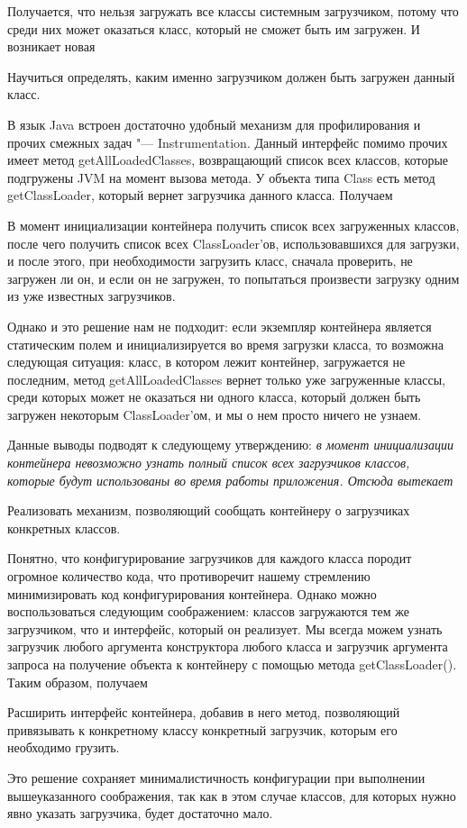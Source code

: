 Получается, что нельзя загружать все классы системным загрузчиком, потому что среди них может оказаться класс, который не сможет быть им загружен.
И возникает новая 
\begin{problem}
Научиться определять, каким именно загрузчиком должен быть загружен данный класс.
\end{problem}

В язык Java встроен достаточно удобный механизм для профилирования и прочих смежных задач "--- Instrumentation. Данный интерфейс помимо прочих имеет метод getAllLoadedClasses, 
возвращающий список всех классов, которые подгружены JVM на момент вызова метода. У объекта типа Class есть метод getClassLoader, который вернет загрузчика данного класса.
Получаем

\begin{solution}
	В момент инициализации контейнера получить список всех загруженных классов, после чего получить список всех ClassLoader'ов, использовавшихся для загрузки, 
	и после этого, при необходимости загрузить класс, сначала проверить, не загружен ли он, и если он не загружен, то попытаться произвести загрузку одним из уже известных загрузчиков.
\end{solution}

Однако и это решение нам не подходит: если экземпляр контейнера является статическим полем и инициализируется во время загрузки класса, то возможна следующая ситуация:
класс, в котором лежит контейнер, загружается не последним, метод getAllLoadedClasses вернет только уже загруженные классы, среди которых может не оказаться ни одного класса, который
должен быть загружен некоторым ClassLoader'ом, и мы о нем просто ничего не узнаем.

Данные выводы подводят к следующему утверждению: \itshape в момент инициализации контейнера невозможно узнать полный список всех загрузчиков классов, 
которые будут использованы во время работы приложения\upshape. Отсюда вытекает

\begin{problem}
Реализовать механизм, позволяющий сообщать контейнеру о загрузчиках конкретных классов.
\end{problem}

Понятно, что конфигурирование загрузчиков для каждого класса породит
огромное количество кода, что противоречит нашему стремлению минимизировать код конфигурирования контейнера. Однако можно воспользоваться следующим соображением:
 классов загружаются тем же загрузчиком, что и интерфейс, который он реализует\upshape. Мы всегда можем узнать загрузчик любого аргумента конструктора любого класса и
загрузчик аргумента запроса на получение объекта к контейнеру с помощью метода getClassLoader().
Таким образом, получаем
\begin{solution}
	Расширить интерфейс контейнера, добавив в него метод, позволяющий привязывать к конкретному классу конкретный загрузчик, которым его необходимо грузить.
\end{solution}
Это решение сохраняет минималистичность конфигурации при выполнении вышеуказанного соображения, так как в этом случае классов, для которых нужно явно указать загрузчика, будет
достаточно мало.
